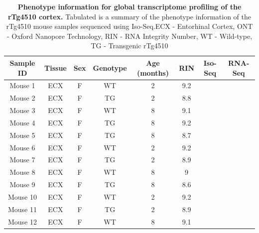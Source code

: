 \vspace{1cm}
\begin{table}[h]
	\captionsetup{width=0.95\textwidth}
	\caption[Phenotype information for global transcriptome profiling of the rTg4510 cortex]%
	{\textbf{Phenotype information for global transcriptome profiling of the rTg4510 cortex.} Tabulated is a summary of the phenotype information of the rTg4510 mouse samples sequenced using Iso-Seq.\newline ECX - Entorhinal Cortex, ONT - Oxford Nanopore Technology, RIN - RNA Integrity Number, WT - Wild-type, TG - Transgenic rTg4510}
	\label{tab:whole_phenotype}
	\centering
	\begin{tabular}{@{}cccccccc@{}}
		\toprule
		Sample ID & Tissue & Sex & Genotype & Age (months) & RIN & Iso-Seq & RNA-Seq  \\ \midrule
		Mouse 1   & ECX    & F   & WT       & 2         & 9.2 & \checkmark       &  \checkmark         \\
		Mouse 2   & ECX    & F   & TG       & 2         & 8.8 & \checkmark        & \checkmark        \\
		Mouse 3   & ECX    & F   & WT       & 8         & 9.1 & \checkmark        & \checkmark        \\
		Mouse 4   & ECX    & F   & TG       & 8         & 9.2 & \checkmark        & \checkmark        \\
		Mouse 5   & ECX    & F   & TG       & 8         & 8.7 & \checkmark        & \checkmark        \\
		Mouse 6   & ECX    & F   & WT       & 2         & 9.2 & \checkmark        & \checkmark        \\
		Mouse 7   & ECX    & F   & TG       & 2         & 8.9 & \checkmark        & \checkmark        \\
		Mouse 8   & ECX    & F   & WT       & 8         & 9   & \checkmark        & \checkmark       \\
		Mouse 9   & ECX    & F   & TG       & 8         & 8.6 & \checkmark        & \checkmark        \\
		Mouse 10  & ECX    & F   & WT       & 2         & 9.2 & \checkmark        & \checkmark        \\
		Mouse 11  & ECX    & F   & TG       & 2         & 8.9 & \checkmark        & \checkmark       \\
		Mouse 12  & ECX    & F   & WT       & 8         & 9.1 & \checkmark        & \checkmark        \\ \bottomrule
	\end{tabular}
\end{table}

